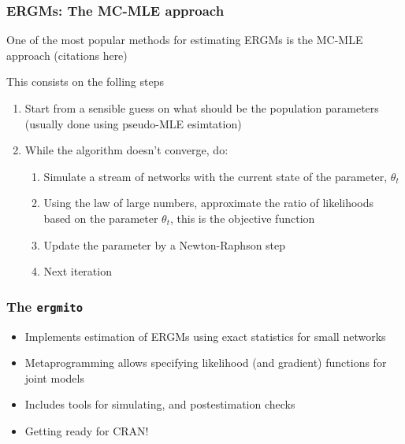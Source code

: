 \documentclass[aspectratio=169, 10pt]{beamer}\usepackage[]{graphicx}\usepackage[]{color}
\newcommand{\ergmitopkg}[0]{\texttt{ergmito}}
\begin{document}
\begin{frame}[label=mcmle]
\frametitle{ERGMs: The MC-MLE approach}

One of the most popular methods for estimating ERGMs is the MC-MLE approach (citations here)

This consists on the folling steps

\begin{enumerate}
\item Start from a sensible guess on what should be the population parameters
(usually done using pseudo-MLE esimtation)
\item While the algorithm doesn't converge, do:
  \begin{enumerate}
  \item Simulate a stream of networks with the current state of the parameter,
  $\theta_t$
  \item Using the law of large numbers, approximate the ratio of likelihoods 
  based on the parameter $\theta_t$, this is the objective function
  \item Update the parameter by a Newton-Raphson step
  \item Next iteration
  \end{enumerate}
\end{enumerate}

\hyperlink{art}{}


\end{frame}

\begin{frame}[label=ergmitopkg]
\frametitle{The \ergmitopkg{}}

\begin{itemize}
\item Implements estimation of ERGMs using exact statistics for small networks
\item Metaprogramming allows specifying likelihood (and gradient) functions for
joint models
\item Includes tools for simulating, and postestimation checks
\item Getting ready for CRAN!
\end{itemize}

\hyperlink{ergmito}{}

\end{frame}
\end{document}
